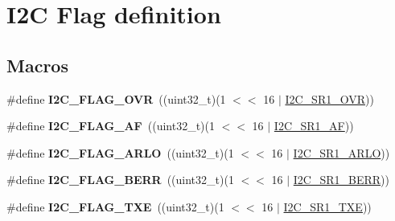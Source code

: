 \hypertarget{group___i2_c___flag__definition}{\section{I2\-C Flag definition}
\label{group___i2_c___flag__definition}
}
\subsection*{Macros}
\begin{DoxyCompactItemize}
\item 
\hypertarget{group___i2_c___flag__definition_gab579673c8ac920db199aa7f18e547fb3}{\#define {\bfseries I2\-C\-\_\-\-F\-L\-A\-G\-\_\-\-O\-V\-R}~((uint32\-\_\-t)(1 $<$$<$ 16 $\vert$ \hyperlink{group___peripheral___registers___bits___definition_gad42d2435d2e64bf710c701c9b17adfb4}{I2\-C\-\_\-\-S\-R1\-\_\-\-O\-V\-R}))}\label{group___i2_c___flag__definition_gab579673c8ac920db199aa7f18e547fb3}

\item 
\hypertarget{group___i2_c___flag__definition_ga2f89dbba9b964e6ade1480705e7a97d4}{\#define {\bfseries I2\-C\-\_\-\-F\-L\-A\-G\-\_\-\-A\-F}~((uint32\-\_\-t)(1 $<$$<$ 16 $\vert$ \hyperlink{group___peripheral___registers___bits___definition_ga62aa2496d4b3955214a16a7bd998fd88}{I2\-C\-\_\-\-S\-R1\-\_\-\-A\-F}))}\label{group___i2_c___flag__definition_ga2f89dbba9b964e6ade1480705e7a97d4}

\item 
\hypertarget{group___i2_c___flag__definition_gae1e67936f4780e42b8bbe04ac9c20a7b}{\#define {\bfseries I2\-C\-\_\-\-F\-L\-A\-G\-\_\-\-A\-R\-L\-O}~((uint32\-\_\-t)(1 $<$$<$ 16 $\vert$ \hyperlink{group___peripheral___registers___bits___definition_gacbc52f6ec6172c71d8b026a22c2f69d2}{I2\-C\-\_\-\-S\-R1\-\_\-\-A\-R\-L\-O}))}\label{group___i2_c___flag__definition_gae1e67936f4780e42b8bbe04ac9c20a7b}

\item 
\hypertarget{group___i2_c___flag__definition_ga0454176b6ddd5c402abc3ef5953a21ad}{\#define {\bfseries I2\-C\-\_\-\-F\-L\-A\-G\-\_\-\-B\-E\-R\-R}~((uint32\-\_\-t)(1 $<$$<$ 16 $\vert$ \hyperlink{group___peripheral___registers___bits___definition_ga1d12990c90ab0757dcfea150ea50b227}{I2\-C\-\_\-\-S\-R1\-\_\-\-B\-E\-R\-R}))}\label{group___i2_c___flag__definition_ga0454176b6ddd5c402abc3ef5953a21ad}

\item 
\hypertarget{group___i2_c___flag__definition_gaeda14a3e9d02ff20a0d001bba9328f3d}{\#define {\bfseries I2\-C\-\_\-\-F\-L\-A\-G\-\_\-\-T\-X\-E}~((uint32\-\_\-t)(1 $<$$<$ 16 $\vert$ \hyperlink{group___peripheral___registers___bits___definition_gafdc4da49c163910203255e384591b6f7}{I2\-C\-\_\-\-S\-R1\-\_\-\-T\-X\-E}))}\label{group___i2_c___flag__definition_gaeda14a3e9d02ff20a0d001bba9328f3d}


\end{DoxyCompactItemize}
